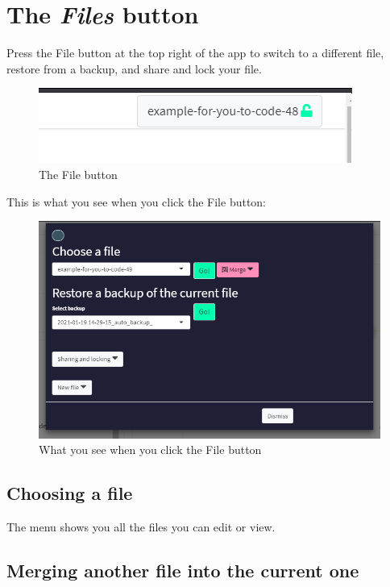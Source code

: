 \documentclass[
]{book}
\begin{document}
\hypertarget{the-files-button}{%
\section{\texorpdfstring{The \emph{Files} button}{The Files button}}\label{the-files-button}}

Press the File button at the top right of the app to switch to a different file, restore from a backup, and share and lock your file.

\begin{figure}
\centering
\includegraphics{_assets/110004.png}
\caption{The File button}
\end{figure}

This is what you see when you click the File button:

\begin{figure}
\centering
\includegraphics{_assets/110000.png}
\caption{What you see when you click the File button}
\end{figure}

\hypertarget{choosing-a-file}{%
\subsection{Choosing a file}\label{choosing-a-file}}

The menu shows you all the files you can edit or view.

\hypertarget{merging-another-file-into-the-current-one}{%
\subsection{Merging another file into the current one}\label{merging-another-file-into-the-current-one}}
\end{document}
